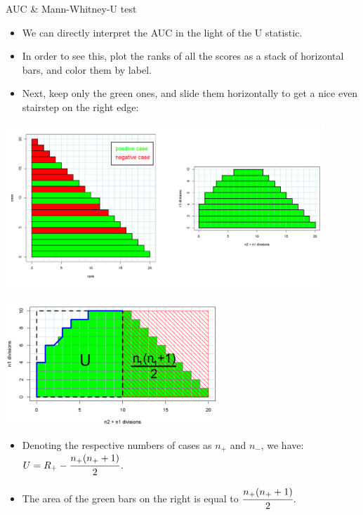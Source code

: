 \documentclass[11pt,compress,t,notes=noshow, xcolor=table]{beamer}
\begin{document}

\begin{vbframe}{AUC \& Mann-Whitney-U test}

\begin{itemize}
  \item We can directly interpret the AUC in the light of the U 
  statistic.
  \item In order to see this, plot the ranks of all the scores as a stack of 
  horizontal bars, and color them by label.
  \item Next, keep only the green ones, and slide them 
  horizontally to get a nice even stairstep on the right edge:
\end{itemize}
\begin{center}
\includegraphics[trim = 0 40 0 0, clip, width=0.9\textwidth]
{figure_man/roc-mannwhitney3.png}
\end{center}

\framebreak

\begin{center}
\includegraphics[width=0.6\textwidth]{figure_man/roc-mannwhitney2.png}
\end{center}

\begin{itemize}
  \item Denoting the respective numbers of cases as $n_+$ and $n_-$, we 
  have: $U = R_+ - \cfrac{n_+(n_+ + 1)}{2}$.
  \item The area of the green bars on the right is equal to 
  $\cfrac{n_+(n_+ + 1)}{2}$.
\end{itemize}


\end{vbframe}
\end{document}

